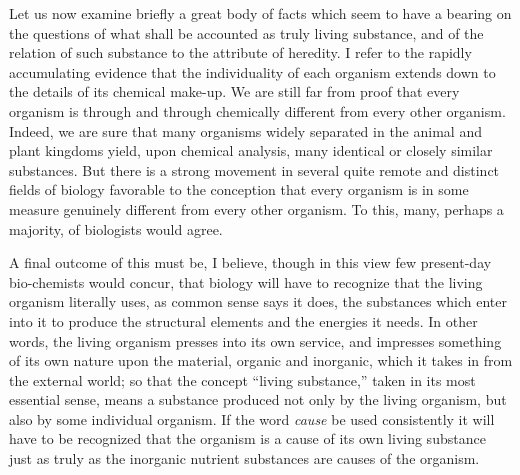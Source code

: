 \documentclass[a4paper, 11pt, oneside, polutonikogreek, english]{article}
\begin{document}
Let us now examine briefly a great body of facts which seem to have a bearing on the questions of what shall be accounted as truly living substance, and of the relation of such substance to the attribute of heredity. I refer to the rapidly accumulating evidence that the individuality of each organism extends down to the details of its chemical make-up. We are still far from proof that every organism is through and through chemically different from every other organism. Indeed, we are sure that many organisms widely separated in the animal and plant kingdoms yield, upon chemical analysis, many identical or closely similar substances. But there is a strong movement in several quite remote and distinct fields of biology favorable to the conception that every organism is in some measure genuinely different from every other organism. To this, many, perhaps a majority, of biologists would agree.

A final outcome of this must be, I believe, though in this view few present-day bio-chemists would concur, that biology will have to recognize that the living organism literally uses, as common sense says it does, the substances which enter into it to produce the structural elements and the energies it needs. In other words, the living organism presses into its own service, and impresses something of its own nature upon the material, organic and inorganic, which it takes in from the external world; so that the concept ``living substance,'' taken in its most essential sense, means a substance produced not only by the living organism, but also by some individual organism. If the word \emph{cause} be used consistently it will have to be recognized that the organism is a cause of its own living substance just as truly as the inorganic nutrient substances are causes of the organism.
\end{document}
